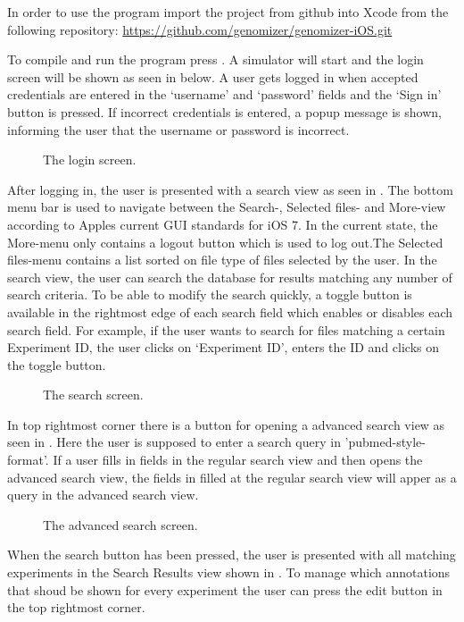In order to use the program import the project from github into Xcode from the following repository:
\url{https://github.com/genomizer/genomizer-iOS.git} 

To compile and run the program press . A simulator will start and the login screen will be shown as seen in   below. A user gets logged in when accepted credentials are entered in the ‘username’ and ‘password’ fields and the ‘Sign in’ button is pressed. If incorrect credentials is entered, a popup message is shown, informing the user that the username or password is incorrect.

\begin{figure}[ht]
\caption{The login screen.}
\label{fig:ios_login}
\end{figure}
\FloatBarrier
After logging in, the user is presented with a search view as seen in . The bottom menu bar is used to navigate between the Search-, Selected files- and More-view according to Apples current GUI standards for iOS 7. In the current state, the More-menu only contains a logout button which is used to log out.The Selected files-menu contains a list sorted on file type of files selected by the user. In the search view, the user can search the database for results matching any number of search criteria. To be able to modify the search quickly, a toggle button is available in the rightmost edge of each search field which enables or disables each search field. For example, if the user wants to search for files matching a certain Experiment ID, the user clicks on ‘Experiment ID’, enters the ID and clicks on the toggle button. 

\begin{figure}[ht]
\caption{The search screen.}
\label{fig:ios_search}
\end{figure}
\FloatBarrier
In top rightmost corner there is a button for opening a advanced search view as seen in . Here the user is supposed to enter a search query in ’pubmed-style-format’. If a user fills in fields in the regular search view and then opens the advanced search view, the fields in filled at the regular search view will apper as a query in the advanced search view.

\begin{figure}[ht]
\caption{The advanced search screen.}
\label{fig:ios_advSearch}
\end{figure}
\FloatBarrier
When the search button has been pressed, the user is presented with all matching experiments in the Search Results view shown in . To manage which annotations that shoud be shown for every experiment the user can press the edit button in the top rightmost corner.

